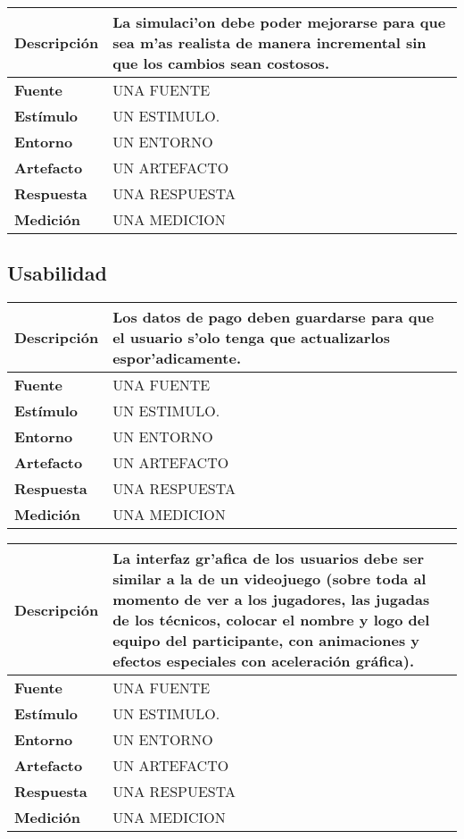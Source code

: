 \begin{center}
  \begin{tabular}{| l | p{10cm} | }
    \hline
  \textbf{Descripción} & La simulaci'on debe poder mejorarse para que sea m'as realista de manera incremental sin que los cambios sean costosos.\\  \hline
  \textbf{Fuente} & UNA FUENTE\\  \hline
  \textbf{Estímulo} & UN ESTIMULO.\\  \hline
  \textbf{Entorno} & UN ENTORNO\\  \hline
  \textbf{Artefacto} & UN ARTEFACTO\\  \hline
  \textbf{Respuesta} & UNA RESPUESTA\\  \hline
  \textbf{Medición} & UNA MEDICION\\  \hline
  \end{tabular}
\end{center} 



\subsection{Usabilidad}

\begin{center}
  \begin{tabular}{| l | p{10cm} | }
    \hline
  \textbf{Descripción} & Los datos de pago deben guardarse para que el usuario s'olo tenga que actualizarlos espor'adicamente.\\  \hline
  \textbf{Fuente} & UNA FUENTE\\  \hline
  \textbf{Estímulo} & UN ESTIMULO.\\  \hline
  \textbf{Entorno} & UN ENTORNO\\  \hline
  \textbf{Artefacto} & UN ARTEFACTO\\  \hline
  \textbf{Respuesta} & UNA RESPUESTA\\  \hline
  \textbf{Medición} & UNA MEDICION\\  \hline
  \end{tabular}
\end{center} 

\begin{center}
  \begin{tabular}{| l | p{10cm} | }
    \hline
  \textbf{Descripción} & La interfaz gr'afica de los usuarios debe ser similar a la de un videojuego (sobre toda al momento de ver a los jugadores, las jugadas de los técnicos, colocar el nombre y logo del equipo del participante, con animaciones y efectos especiales con aceleración gráfica). \\  \hline
  \textbf{Fuente} & UNA FUENTE\\  \hline
  \textbf{Estímulo} & UN ESTIMULO.\\  \hline
  \textbf{Entorno} & UN ENTORNO\\  \hline
  \textbf{Artefacto} & UN ARTEFACTO\\  \hline
  \textbf{Respuesta} & UNA RESPUESTA\\  \hline
  \textbf{Medición} & UNA MEDICION\\  \hline
  \end{tabular}
\end{center} 

